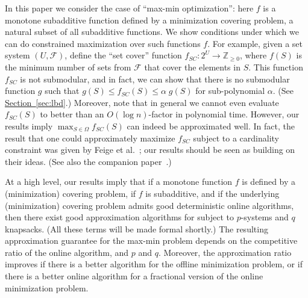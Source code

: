 \documentclass[11pt,letterpaper]{article}
\newcommand{\lref}[2][]{\hyperref[#2]{#1~\ref*{#2}}}
\newcommand{\Z}[0]{{\ensuremath{\mathbb{Z}}}}
\def\f{\ensuremath {\mathcal{F}}\xspace}
\newcommand{\I}{{\Omega}}
\newcounter{note}[section]
\begin{document}
In this paper we consider the case of ``max-min optimization'': here $f$
is a monotone subadditive function defined by a minimization covering
problem, a natural subset of all subadditive functions. We show
conditions under which we can do constrained maximization over such
functions $f$.  For example, given a set system $(U, \f)$, define the
``set cover'' function $f_{SC}: 2^U \to \Z_{\geq 0}$, where $f(S)$ is
the minimum number of sets from $\f$ that cover the elements in
$S$. This function $f_{SC}$ is not submodular, and in fact, we can show
that there is no submodular function $g$ such that $g(S) \leq f_{SC}(S)
\leq \alpha\; g(S)$ for sub-polynomial $\alpha$. (See
\lref[Section]{sec:lbd}.) Moreover, note that in general we cannot even
evaluate $f_{SC}(S)$ to better than an $O(\log n)$-factor in polynomial
time.  However, our results imply $\max_{S \in \I} f_{SC}(S)$ can indeed
be approximated well.  In fact, the result that one could approximately
maximize $f_{SC}$ subject to a cardinality constraint was given by Feige
et al.~\cite{FJMM07}; our results should be seen as building on their
ideas. (See also the companion paper~\cite{GNR-k-rob}.)

At a high level, our results imply that if a monotone function $f$ is defined by a (minimization) covering problem, if
$f$ is subadditive, and if the underlying (minimization) covering problem admits good deterministic online algorithms,
then there exist good approximation algorithms for \maxf subject to $p$-systems and $q$ knapsacks.  (All these terms
will be made formal shortly.) The resulting approximation guarantee for the max-min problem depends on the competitive
ratio of the online algorithm, and $p$ and $q$. Moreover, the approximation ratio improves if there is a better
algorithm for the offline minimization problem, or if there is a better online algorithm for a fractional version of
the online minimization problem.
\end{document}
